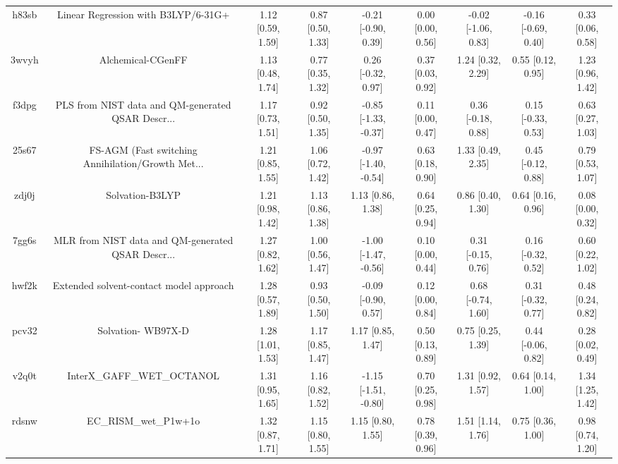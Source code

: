 \documentclass{article}
\begin{document}
\begin{center}
\begin{longtable}{|ccccccccc|}
 h83sb &                Linear Regression with B3LYP/6-31G+ &  1.12 [0.59, 1.59] &  0.87 [0.50, 1.33] &   -0.21 [-0.90, 0.39] &  0.00 [0.00, 0.56] &  -0.02 [-1.06, 0.83] &  -0.16 [-0.69, 0.40] &     0.33 [0.06, 0.58] \\
 3wvyh &                                  Alchemical-CGenFF &  1.13 [0.48, 1.74] &  0.77 [0.35, 1.32] &    0.26 [-0.32, 0.97] &  0.37 [0.03, 0.92] &    1.24 [0.32, 2.29] &    0.55 [0.12, 0.95] &     1.23 [0.96, 1.42] \\
 f3dpg &  PLS from NIST data and QM-generated QSAR Descr... &  1.17 [0.73, 1.51] &  0.92 [0.50, 1.35] &  -0.85 [-1.33, -0.37] &  0.11 [0.00, 0.47] &   0.36 [-0.18, 0.88] &   0.15 [-0.33, 0.53] &     0.63 [0.27, 1.03] \\
 25s67 &  FS-AGM (Fast switching Annihilation/Growth Met... &  1.21 [0.85, 1.55] &  1.06 [0.72, 1.42] &  -0.97 [-1.40, -0.54] &  0.63 [0.18, 0.90] &    1.33 [0.49, 2.35] &   0.45 [-0.12, 0.88] &     0.79 [0.53, 1.07] \\
 zdj0j &                                    Solvation-B3LYP &  1.21 [0.98, 1.42] &  1.13 [0.86, 1.38] &     1.13 [0.86, 1.38] &  0.64 [0.25, 0.94] &    0.86 [0.40, 1.30] &    0.64 [0.16, 0.96] &     0.08 [0.00, 0.32] \\
 7gg6s &  MLR from NIST data and QM-generated QSAR Descr... &  1.27 [0.82, 1.62] &  1.00 [0.56, 1.47] &  -1.00 [-1.47, -0.56] &  0.10 [0.00, 0.44] &   0.31 [-0.15, 0.76] &   0.16 [-0.32, 0.52] &     0.60 [0.22, 1.02] \\
 hwf2k &            Extended solvent-contact model approach &  1.28 [0.57, 1.89] &  0.93 [0.50, 1.50] &   -0.09 [-0.90, 0.57] &  0.12 [0.00, 0.84] &   0.68 [-0.74, 1.60] &   0.31 [-0.32, 0.77] &     0.48 [0.24, 0.82] \\
 pcv32 &                                 Solvation- WB97X-D &  1.28 [1.01, 1.53] &  1.17 [0.85, 1.47] &     1.17 [0.85, 1.47] &  0.50 [0.13, 0.89] &    0.75 [0.25, 1.39] &   0.44 [-0.06, 0.82] &     0.28 [0.02, 0.49] \\
 v2q0t &                         InterX\_GAFF\_WET\_OCTANOL &  1.31 [0.95, 1.65] &  1.16 [0.82, 1.52] &  -1.15 [-1.51, -0.80] &  0.70 [0.25, 0.98] &    1.31 [0.92, 1.57] &    0.64 [0.14, 1.00] &     1.34 [1.25, 1.42] \\
 rdsnw &                              EC\_RISM\_wet\_P1w+1o &  1.32 [0.87, 1.71] &  1.15 [0.80, 1.55] &     1.15 [0.80, 1.55] &  0.78 [0.39, 0.96] &    1.51 [1.14, 1.76] &    0.75 [0.36, 1.00] &     0.98 [0.74, 1.20] \\

\end{longtable}
\end{center}
\end{document}
